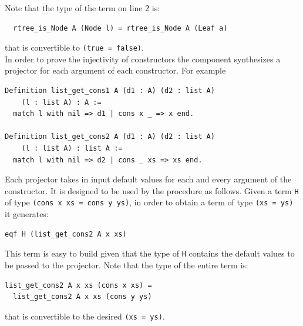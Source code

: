 \documentclass[sigplan,10pt,review]{acmart}\settopmatter{printfolios=true,printccs=false,printacmref=false}
\newcommand{\derive}[1]{\keys{#1}}
\begin{document}
\noindent
Note that the type of the term on line 2 is:

\begin{minipage}{\textwidth}\begin{lstlisting}
  rtree_is_Node A (Node l) = rtree_is_Node A (Leaf a)
\end{lstlisting}\end{minipage}

\noindent
that is convertible to \lstinline+(true = false)+.
\\

In order to prove the injectivity of constructors the \derive{projK}
component synthesizes a projector for each argument of each constructor.
For example

\begin{minipage}{\textwidth}\begin{lstlisting}
Definition list_get_cons1 A (d1 : A) (d2 : list A)
    (l : list A) : A :=
  match l with nil => d1 | cons x _ => x end.

Definition list_get_cons2 A (d1 : A) (d2 : list A)
    (l : list A) : list A :=
  match l with nil => d2 | cons _ xs => xs end.
\end{lstlisting}\end{minipage}

\noindent
Each projector takes in input default values for each and every
argument of the constructor. It is designed to be used by the
\derive{injection} procedure as follows. Given a term
\lstinline+H+ of type \lstinline+(cons x xs = cons y ys)+, in order
to obtain a term of type \lstinline+(xs = ys)+ it generates:

\begin{minipage}{\textwidth}\begin{lstlisting}
eqf H (list_get_cons2 A x xs)
\end{lstlisting}\end{minipage}

\noindent
This term is easy to build given that the type of \lstinline+H+
contains the default values to be passed to the projector.
Note that the type of the entire term is:

\begin{minipage}{\textwidth}\begin{lstlisting}
list_get_cons2 A x xs (cons x xs) =
  list_get_cons2 A x xs (cons y ys)
\end{lstlisting}\end{minipage}

\noindent
that is convertible to the desired \lstinline+(xs = ys)+.
\end{document}
